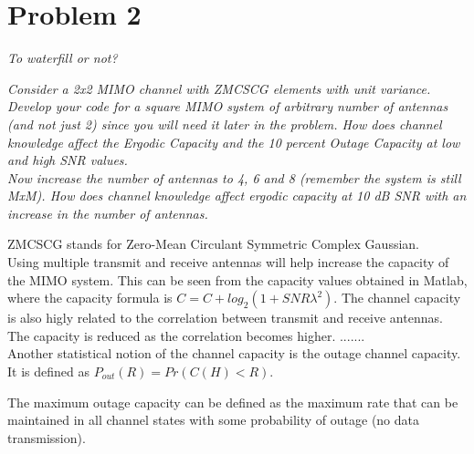 \section{Problem 2}
\textit{To waterfill or not?}

\textit{Consider a 2x2 MIMO channel with ZMCSCG elements with unit variance. Develop your code for a square MIMO system of arbitrary number of antennas (and not just 2) since you will need it later in the problem. How does channel knowledge affect the Ergodic Capacity and the 10 percent Outage Capacity at low and high SNR values.} \\

\textit{Now increase the number of antennas to 4, 6 and 8 (remember the system is still MxM). How does channel knowledge affect ergodic capacity at 10 dB SNR with an increase in the number of antennas.}

ZMCSCG stands for Zero-Mean Circulant Symmetric Complex Gaussian. \\

Using multiple transmit and receive antennas will help increase the capacity of the MIMO system. This can be seen from the capacity values obtained in Matlab, where the capacity formula is $C=C+log_{2}(1+SNR \lambda ^{2})$. The channel capacity is also higly related to the correlation between transmit and receive antennas. The capacity is reduced as the correlation becomes higher. .......\\

Another statistical notion of the channel capacity is the outage channel capacity. It is defined as $P_{out}(R)=Pr(C(H)<R)$. 

The maximum outage capacity can be defined as the maximum rate that can be maintained in all channel states with some probability of outage (no data transmission).
